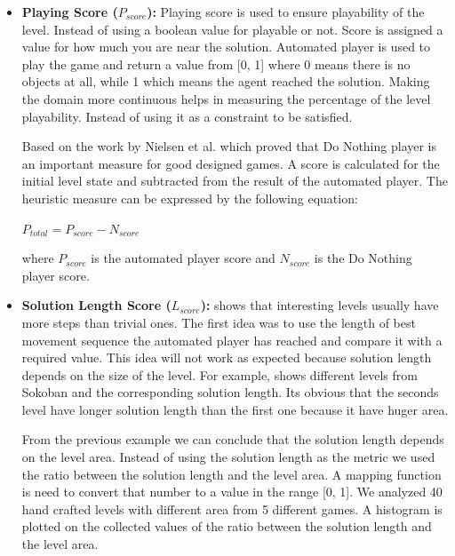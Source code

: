 \begin{itemize}
	\item \textbf{Playing Score ($P_{score}$):} Playing score is used to ensure playability of the level. Instead of using a boolean value for playable or not. Score is assigned a value for how much you are near the solution. Automated player is used to play the game and return a value from [0, 1] where 0 means there is no objects at all, while 1 which means the agent reached the solution. Making the domain more continuous helps in measuring the percentage of the level playability. Instead of using it as a constraint to be satisfied.\\\par
	
	Based on the work by Nielsen et al.\cite{gvgpPerformanceProfiles} which proved that Do Nothing player is an important measure for good designed games. A score is calculated for the initial level state and subtracted from the result of the automated player. The heuristic measure can be expressed by the following equation:
	\begin{center}$ P_{total} = P_{score} - N_{score}$\end{center}
	where $P_{score}$ is the automated player score and $N_{score}$ is the Do Nothing player score.
	
	\item\textbf{Solution Length Score ($L_{score}$):}  shows that interesting levels usually have more steps than trivial ones. The first idea was to use the length of best movement sequence the automated player has reached and compare it with a required value. This idea will not work as expected because solution length depends on the size of the level. For example,  shows different levels from Sokoban and the corresponding solution length. Its obvious that the seconds level have longer solution length than the first one because it have huger area.
	
	
	From the previous example we can conclude that the solution length depends on the level area. Instead of using the solution length as the metric we used the ratio between the solution length and the level area. A mapping function is need to convert that number to a value in the range [0, 1]. We analyzed 40 hand crafted levels with different area from 5 different games. A histogram is plotted on the collected values of the ratio between the solution length and the level area.
	

\end{itemize}
